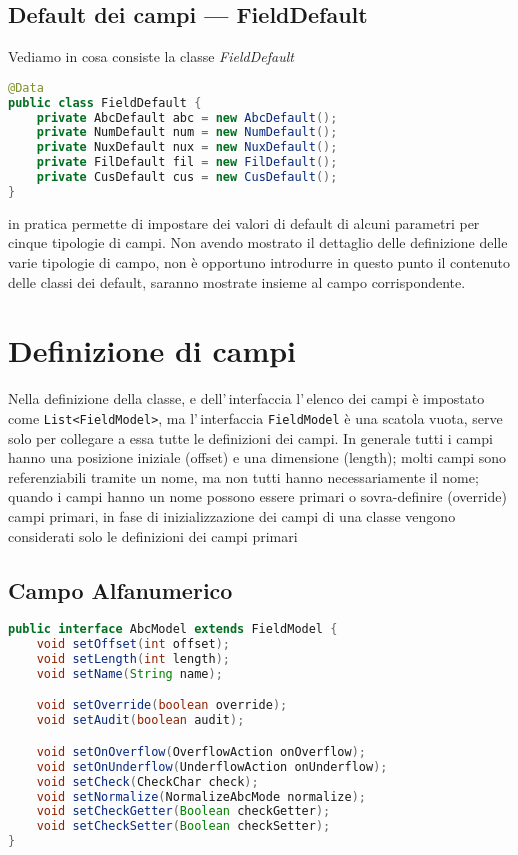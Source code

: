 \documentclass[a4paper,10pt]{report}
\begin{document}
\subsection{Default dei campi --- FieldDefault}
Vediamo in cosa consiste la classe \textsl{FieldDefault}

\begin{lstlisting}[language=java, caption=interfaccia FieldDefault, 
label=code:FieldDefault]
@Data
public class FieldDefault {
    private AbcDefault abc = new AbcDefault();
    private NumDefault num = new NumDefault();
    private NuxDefault nux = new NuxDefault();
    private FilDefault fil = new FilDefault();
    private CusDefault cus = new CusDefault();
}
\end{lstlisting}
in pratica permette di impostare dei valori di default di alcuni parametri per
cinque tipologie di campi. Non avendo mostrato il dettaglio delle definizione
delle varie tipologie di campo, non è opportuno introdurre in questo punto il
contenuto delle classi dei default, saranno mostrate insieme al campo 
corrispondente.

\section{Definizione di campi}
Nella definizione della classe, e dell'\,interfaccia l'\,elenco dei campi è
impostato come \verb!List<FieldModel>!, ma l'\,interfaccia \verb!FieldModel! è
una scatola vuota, serve solo per collegare a essa tutte le definizioni dei
campi. In generale tutti i campi hanno una posizione iniziale (offset) e una
dimensione (length); molti campi sono referenziabili tramite un nome, 
ma non tutti hanno necessariamente il nome; quando i campi hanno un nome
possono essere primari o sovra-definire (override) campi primari, in fase di 
inizializzazione dei campi di una classe vengono considerati solo le definizioni
dei campi primari

\subsection{Campo Alfanumerico}

\begin{lstlisting}[language=java, caption=interfaccia AbcModel, 
label=code:AbcModel]
public interface AbcModel extends FieldModel {
    void setOffset(int offset);
    void setLength(int length);
    void setName(String name);

    void setOverride(boolean override);
    void setAudit(boolean audit);

    void setOnOverflow(OverflowAction onOverflow);
    void setOnUnderflow(UnderflowAction onUnderflow);
    void setCheck(CheckChar check);
    void setNormalize(NormalizeAbcMode normalize);
    void setCheckGetter(Boolean checkGetter);
    void setCheckSetter(Boolean checkSetter);
}
\end{lstlisting}
\end{document}
